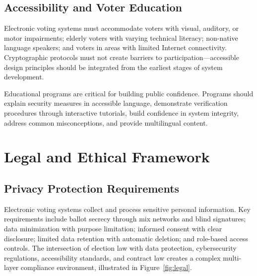 \documentclass[sigconf,nonacm]{acmart}
\begin{document}
\subsection{Accessibility and Voter Education}

Electronic voting systems must accommodate voters with visual, auditory, or motor
impairments; elderly voters with varying technical literacy; non-native language
speakers; and voters in areas with limited Internet connectivity. Cryptographic
protocols must not create barriers to participation---accessible design principles
should be integrated from the earliest stages of system development.

Educational programs are critical for building public confidence. Programs should
explain security measures in accessible language, demonstrate verification procedures
through interactive tutorials, build confidence in system integrity, address common
misconceptions, and provide multilingual content.

\section{Legal and Ethical Framework}

\subsection{Privacy Protection Requirements}

Electronic voting systems collect and process sensitive personal information. Key
requirements include ballot secrecy through mix networks and blind signatures; data
minimization with purpose limitation; informed consent with clear disclosure; limited
data retention with automatic deletion; and role-based access controls. The intersection
of election law with data protection, cybersecurity regulations, accessibility
standards, and contract law creates a complex multi-layer compliance environment,
illustrated in Figure~\ref{fig:legal}.
\end{document}
